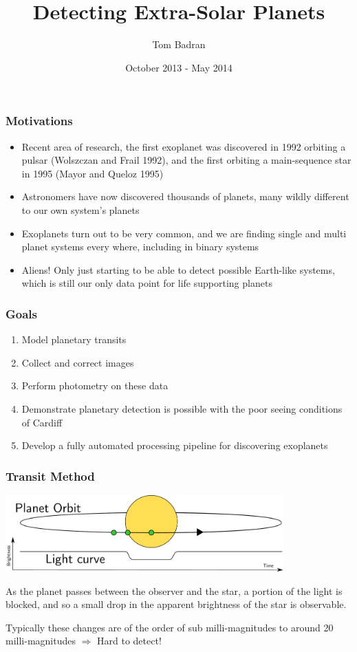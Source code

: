\documentclass{beamer}
\title{Detecting Extra-Solar Planets}
\author{Tom Badran}
\date{October 2013 - May 2014}
\begin{document}
\frame{\titlepage}
  \begin{frame}
    \frametitle{Motivations}
    \begin{itemize}
        \item Recent area of research, the first exoplanet was discovered in 1992 orbiting a pulsar (Wolszczan and Frail 1992), and the first orbiting a main-sequence star in 1995 (Mayor and Queloz 1995)
        \item Astronomers have now discovered thousands of planets, many wildly different to our own system's planets
        \item Exoplanets turn out to be very common, and we are finding single and multi planet systems every where, including in binary systems
        \item Aliens! Only just starting to be able to detect possible Earth-like systems, which is still our only data point for life supporting planets
    \end{itemize}
  \end{frame}
  \begin{frame}
    \frametitle{Goals}
    \begin{enumerate}
        \item Model planetary transits
        \item Collect and correct images
        \item Perform photometry on these data
        \item Demonstrate planetary detection is possible with the poor seeing conditions of Cardiff
        \item Develop a fully automated processing pipeline for discovering exoplanets
    \end{enumerate}
  \end{frame}
  \begin{frame}
    \frametitle{Transit Method}
    \begin{center}
    \includegraphics[width=0.8\textwidth]{images/planetary_transit.pdf}
    \end{center}
    As the planet passes between the observer and the star, a portion of the light is blocked, and so a small drop in the apparent brightness of the star is observable.

    Typically these changes are of the order of sub milli-magnitudes to around 20 milli-magnitudes $\Rightarrow$ Hard to detect!
  \end{frame}
\end{document}
